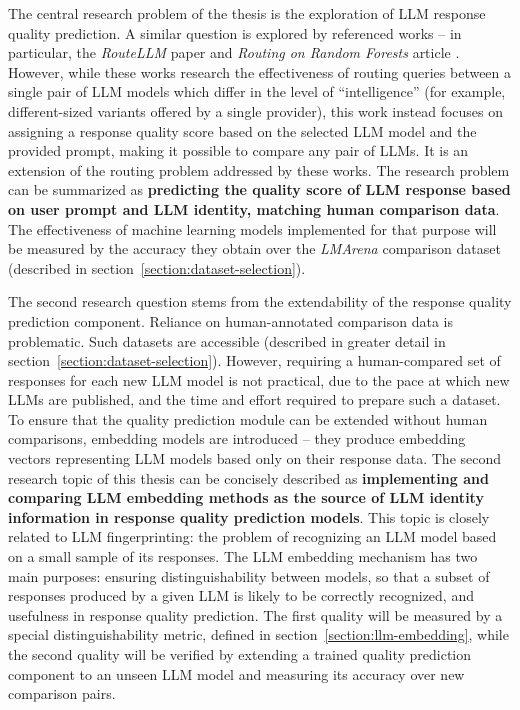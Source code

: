 \documentclass[a4paper,11pt,twoside]{report}
\theoremstyle{definition}
\begin{document}
The central research problem of the thesis is the exploration of LLM response quality prediction. A similar question is explored by referenced works -- in particular, the \textit{RouteLLM} paper \cite{ong2025routellm} and \textit{Routing on Random Forests} article \cite{notdiamond2024rorf}. However, while these works research the effectiveness of routing queries between a single pair of LLM models which differ in the level of ``intelligence'' (for example, different-sized variants offered by a single provider), this work instead focuses on assigning a response quality score based on the selected LLM model and the provided prompt, making it possible to compare any pair of LLMs. It is an extension of the routing problem addressed by these works. The research problem can be summarized as \textbf{predicting the quality score of LLM response based on user prompt and LLM identity, matching human comparison data}. The effectiveness of machine learning models implemented for that purpose will be measured by the accuracy they obtain over the \textit{LMArena} comparison dataset (described in section~\ref{section:dataset-selection}).

The second research question stems from the extendability of the response quality prediction component. Reliance on human-annotated comparison data is problematic. Such datasets are accessible (described in greater detail in section~\ref{section:dataset-selection}). However, requiring a human-compared set of responses for each new LLM model is not practical, due to the pace at which new LLMs are published, and the time and effort required to prepare such a dataset. To ensure that the quality prediction module can be extended without human comparisons, embedding models are introduced -- they produce embedding vectors representing LLM models based only on their response data. The second research topic of this thesis can be concisely described as \textbf{implementing and comparing LLM embedding methods as the source of LLM identity information in response quality prediction models}. This topic is closely related to LLM fingerprinting: the problem of recognizing an LLM model based on a small sample of its responses. The LLM embedding mechanism has two main purposes: ensuring distinguishability between models, so that a subset of responses produced by a given LLM is likely to be correctly recognized, and usefulness in response quality prediction. The first quality will be measured by a special distinguishability metric, defined in section~\ref{section:llm-embedding}, while the second quality will be verified by extending a trained quality prediction component to an unseen LLM model and measuring its accuracy over new comparison pairs.
\end{document}
